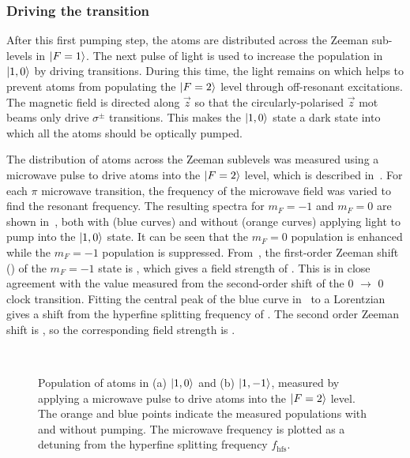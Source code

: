 \subsubsection{Driving the  transition}
After this first pumping step, the atoms are distributed across the
Zeeman sub-levels in \(\ket{F=1}\). The next pulse of light is used to
increase the population in \(\ket{1,0}\) by driving 
transitions. During this time, the  light remains on which
helps to prevent atoms from populating the \(\ket{F=2}\) level through
off-resonant  excitations. The magnetic field is directed
along $\vec{z}$ so that the circularly-polarised \(\vec{z}\) \ac{mot} beams only
drive \(\sigma^{\pm}\) transitions. This makes the \(\ket{1,0}\) state
a dark state into which all the atoms should be optically pumped. 
\par\noindent
The distribution of atoms across the Zeeman sublevels was measured
using a microwave pulse to drive atoms into the \(\ket{F=2}\) level,
which is described in~. For each \(\pi\)
microwave transition, the frequency of the microwave field was varied
to find the resonant frequency. The resulting spectra for \(m_F = -1\)
and \(m_F = 0\) are shown in~,
both with (blue curves) and without (orange curves) applying light to pump into the \(\ket{1,0}\)
state. It can be seen that the $m_F=0$ population is enhanced while
the $m_F=-1$ population is suppressed. From~, the first-order
Zeeman shift () of the $m_F = -1$ state is , which gives a
field strength of . This is in close agreement
with the value measured from the second-order shift of the 0
\(\rightarrow\) 0 clock transition. Fitting the central peak
of the blue curve in~ to a
Lorentzian gives a shift from the hyperfine splitting frequency of .
The second order Zeeman shift is
, so the corresponding field
strength is . 
\begin{figure}[!htbp]
    \centering
    \def\svgwidth{\columnwidth}
    \\
    \caption[\(m_F\) populations before and after  pumping]{Population of atoms in (a) \(\ket{1,0}\) and (b) \(\ket{1,-1}\), measured by applying a  microwave pulse to drive atoms into the \(\ket{F=2}\) level. The orange and blue points indicate the measured populations with and without  pumping. The microwave frequency is plotted as a detuning from the hyperfine splitting frequency \(f_\text{hfs}\).}
    \label{fig:step2_microwave_spec}
\end{figure} 
